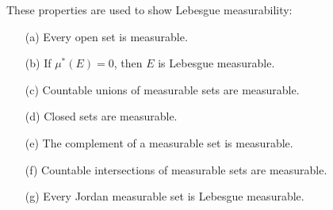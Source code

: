 
\begin{theorem}
  These properties are used to show Lebesgue measurability:
  \begin{enumerate}
    \item[(a)] Every open set is measurable.

    \item[(b)] If $\mu^*(E) = 0$, then $E$ is Lebesgue measurable.

    \item[(c)] Countable unions of measurable sets are measurable.

    \item[(d)] Closed sets are measurable.

    \item[(e)] The complement of a measurable set is measurable.

    \item[(f)] Countable intersections of measurable sets are measurable.

    \item[(g)] Every Jordan measurable set is Lebesgue measurable.
  \end{enumerate}
\end{theorem}
